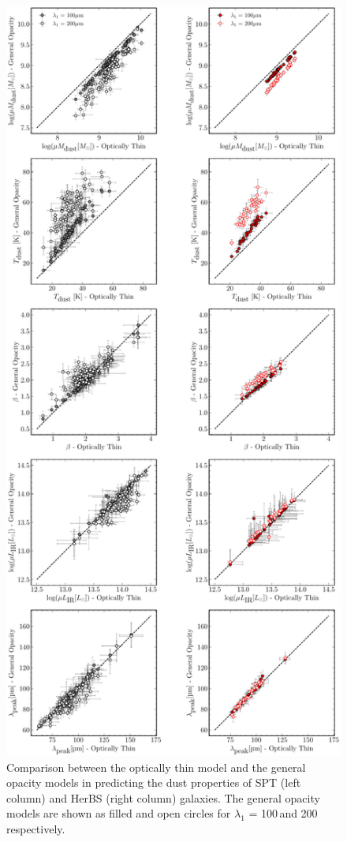 \begin{figure}
	\centering
	\includegraphics[height=0.9\textheight]{Figures/optically_thin_against_general_opacity.pdf}
	\caption{Comparison between the optically thin model and the general opacity models in predicting the dust properties of SPT (left column) and HerBS (right column) galaxies. The general opacity models are shown as filled and open circles for $\lambda_1$ = 100\,\micron and 200\,\micron respectively.}
	\label{fig:comparison_optically_thin_general_opacity}
\end{figure}

